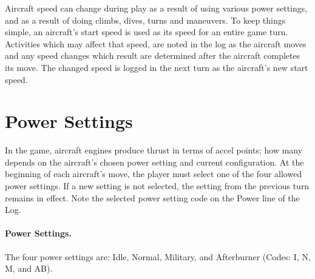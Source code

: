 
\label{rule:changing-aircraft-speed}

Aircraft speed can change during play as a result of using various power settings, and as a result of doing climbs, dives, turns and maneuvers. To keep things simple, an aircraft's start speed is used as its speed for an entire game turn. Activities which may affect that speed, are noted in the log as the aircraft moves and any speed changes which result are determined after the aircraft completes its move. The changed speed is logged in the next turn as the aircraft's new start speed.

\section{Power Settings}
\label{rule:power-settings}

In the game, aircraft engines produce thrust in terms of accel points; how many depends on the aircraft's chosen power setting and current configuration. At the beginning of each aircraft's move, the player must select one of the four allowed power settings. If a new setting is not selected, the setting from the previous turn remains in effect. Note the selected power setting code on the Power line of the Log.

\paragraph{Power Settings.} The four power settings are: Idle, Normal, Military, and Afterburner (Codes: I, N, M, and AB).

